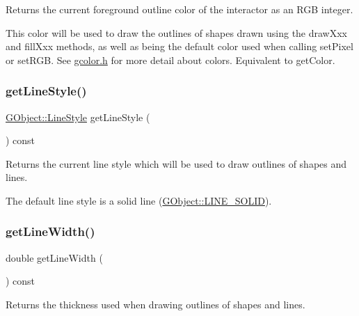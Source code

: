 Returns the current foreground outline color of the interactor as an R\+GB integer. 

This color will be used to draw the outlines of shapes drawn using the draw\+Xxx and fill\+Xxx methods, as well as being the default color used when calling set\+Pixel or set\+R\+GB. See \mbox{\hyperlink{gcolor_8h_source}{gcolor.\+h}} for more detail about colors. Equivalent to get\+Color. \mbox{\label{classGDrawingSurface_aaf1f5ea8281e5e3486662878d26f0a13}} 
\subsubsection{\texorpdfstring{get\+Line\+Style()}{getLineStyle()}}
{\footnotesize\ttfamily \mbox{\hyperlink{classGObject_a86e0f5648542856159bb40775c854aa7}{G\+Object\+::\+Line\+Style}} get\+Line\+Style (\begin{DoxyParamCaption}{ }\end{DoxyParamCaption}) const\hspace{0.3cm}{\ttfamily [virtual]}}



Returns the current line style which will be used to draw outlines of shapes and lines. 

The default line style is a solid line (\mbox{\hyperlink{classGObject_a86e0f5648542856159bb40775c854aa7a700c78bc2cd76acaab26651bf7b4941f}{G\+Object\+::\+L\+I\+N\+E\+\_\+\+S\+O\+L\+ID}}). \mbox{\label{classGDrawingSurface_a85ff266dc3eb63d9f2d8e5a4487fd3c0}} 
\subsubsection{\texorpdfstring{get\+Line\+Width()}{getLineWidth()}}
{\footnotesize\ttfamily double get\+Line\+Width (\begin{DoxyParamCaption}{ }\end{DoxyParamCaption}) const\hspace{0.3cm}{\ttfamily [virtual]}}



Returns the thickness used when drawing outlines of shapes and lines. 

